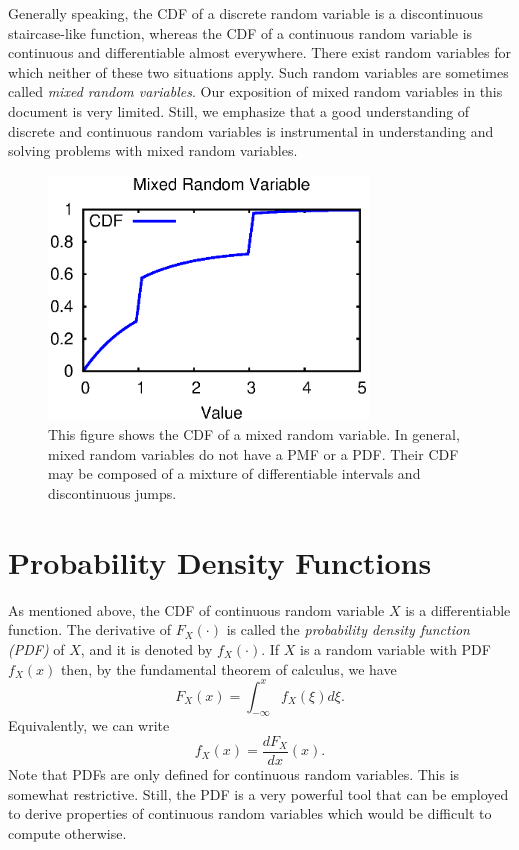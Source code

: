 Generally speaking, the CDF of a discrete random variable is a discontinuous staircase-like function, whereas the CDF of a continuous random variable is continuous and differentiable almost everywhere.
There exist random variables for which neither of these two situations apply.
Such random variables are sometimes called \emph{mixed random variables}. 
Our exposition of mixed random variables in this document is very limited.
Still, we emphasize that a good understanding of discrete and continuous random variables is instrumental in understanding and solving problems with mixed random variables.

\begin{figure}[ht]
\begin{center}
\includegraphics[width=8.5cm]{Figures/8chapter/mixed_cdf}
\end{center}
\caption{This figure shows the CDF of a mixed random variable.
In general, mixed random variables do not have a PMF or a PDF.
Their CDF may be composed of a mixture of differentiable intervals and discontinuous jumps.}
\end{figure}


\section{Probability Density Functions}

As mentioned above, the CDF of continuous random variable $X$ is a differentiable function.
The derivative of $F_X (\cdot)$ is called the \emph{probability density function (PDF)} of $X$, and it is denoted by $f_X(\cdot)$. 
If $X$ is a random variable with PDF $f_X (x)$ then, by the fundamental theorem of calculus, we have
\begin{equation*}
F_X (x) = \int_{- \infty}^x f_X (\xi) d\xi .
\end{equation*}
Equivalently, we can write
\begin{equation*}
f_X (x) = \frac{d F_X}{dx} (x) .
\end{equation*}
Note that PDFs are only defined for continuous random variables.
This is somewhat restrictive.
Still, the PDF is a very powerful tool that can be employed to derive properties of continuous random variables which would be difficult to compute otherwise.

